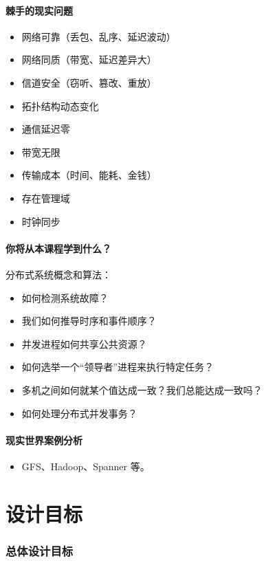 \paragraph{棘手的现实问题}
\begin{itemize}
  \item 网络可靠（丢包、乱序、延迟波动）
  \item 网络同质（带宽、延迟差异大）
  \item 信道安全（窃听、篡改、重放）
  \item 拓扑结构动态变化
  \item 通信延迟零
  \item 带宽无限
  \item 传输成本（时间、能耗、金钱）
  \item 存在管理域
  \item 时钟同步
\end{itemize}

\paragraph{你将从本课程学到什么？}
分布式系统概念和算法：
\begin{itemize}
  \item 如何检测系统故障？
  \item 我们如何推导时序和事件顺序？
  \item 并发进程如何共享公共资源？
  \item 如何选举一个“领导者”进程来执行特定任务？
  \item 多机之间如何就某个值达成一致？我们总能达成一致吗？
  \item 如何处理分布式并发事务？
\end{itemize}

\paragraph{现实世界案例分析}
\begin{itemize}
  \item GFS、Hadoop、Spanner 等。
\end{itemize}

\section{设计目标}

\subsubsection*{总体设计目标}

